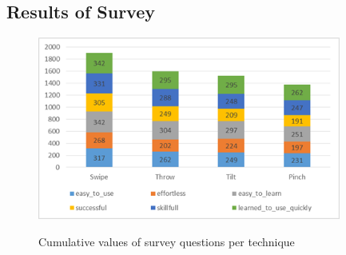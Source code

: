 \subsection{Results of Survey}

\begin{figure}[H]
	{\includegraphics[width = 1\columnwidth , height = 6cm ]{images/survey-data.png}} 
	\caption{
		Cumulative values of survey questions per technique
	}
	\label{fig:surveyResult}
\end{figure}